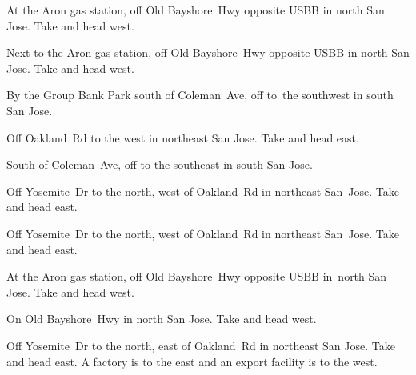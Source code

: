 
\begin{LocationList}

At the Aron gas station, off Old Bayshore~Hwy opposite USBB in north San Jose.
Take   and head west.

Next to the Aron gas station, off Old Bayshore~Hwy opposite USBB in north San Jose.
Take   and head west.

By the Group Bank Park south of Coleman~Ave, off   to~the southwest in south San Jose.

Off Oakland~Rd to the west in northeast San Jose.
Take   and head east.

South of Coleman~Ave, off   to the southeast in south San Jose.

Off Yosemite~Dr to the north, west of Oakland~Rd in northeast San~Jose.
Take   and head east.

Off Yosemite~Dr to the north, west of Oakland~Rd in northeast San~Jose.
Take   and head east.

\Location{\TruckService \Rest \Service}
At the Aron gas station, off Old Bayshore~Hwy opposite USBB in~north San Jose.
Take   and head west.

On Old Bayshore~Hwy in north San Jose.
Take   and head west.

Off Yosemite~Dr to the north, east of Oakland~Rd in northeast San Jose.
Take   and head east.
A factory is to the east and an export facility is to the west.

\end{LocationList}
